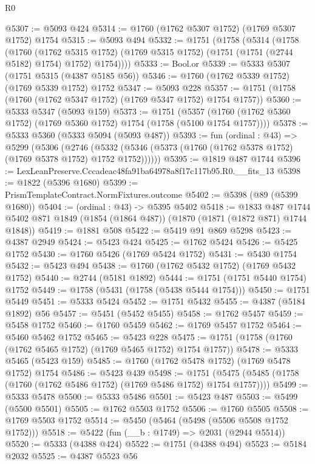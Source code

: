 \begin{lexlean}{R0}
\begin{coremodule}
@5307 := @5093 @424
@5314 := @1760 (@1762 @5307 @1752) (@1769 @5307 @1752) @1754
@5315 := @5093 @494
@5332 := @1751
    (@1758
      (@5314
        (@1758
          (@1760
            (@1762 @5315 @1752)
            (@1769 @5315 @1752)
            (@1751 (@1751 (@2744 @5182) @1754) @1752)
            @1754))))
@5333 := Bool.or
@5339 := @5333 @5307 (@1751 @5315 (@4387 @5185 @56))
@5346 := @1760 (@1762 @5339 @1752) (@1769 @5339 @1752) @1752
@5347 := @5093 @228
@5357 := @1751 (@1758 (@1760 (@1762 @5347 @1752) (@1769 @5347 @1752) @1754 @1757))
@5360 := @5333 @5347 (@5093 @159)
@5373 := @1751
    (@5357 (@1760 (@1762 @5360 @1752) (@1769 @5360 @1752) @1754 (@1758 (@5100 @1754 @1757))))
@5378 := @5333 @5360 (@5333 @5094 (@5093 @487))
@5393 := fun (ordinal : @43) =>
  @5299
    (@5306
      (@2746 (@5332 (@5346 (@5373 (@1760 (@1762 @5378 @1752) (@1769 @5378 @1752) @1752 @1752))))))
@5395 := @1819 @487 @1744
@5396 := LexLeanPreserve.Cccadeac48fa91ba64978a8f17c117b95.R0.__fits_13
@5398 := @1822 (@5396 @1680)
@5399 := PrismTemplateContract.NormFixtures.outcome
@5402 := @5398 (@89 (@5399 @1680))
@5404 := (ordinal : @43) -> @5395 @5402
@5418 := @1833
    @487
    @1744
    @5402
    @871
    @1849
    (@1854 (@1864 @487))
    (@1870 (@1871 (@1872 @871) @1744 @1848))
@5419 := @1881 @508
@5422 := @5419 @91 @869 @5298
@5423 := @4387 @2949
@5424 := @5423 @424
@5425 := @1762 @5424
@5426 := @5425 @1752
@5430 := @1760 @5426 (@1769 @5424 @1752)
@5431 := @5430 @1754
@5432 := @5423 @494
@5438 := @1760 (@1762 @5432 @1752) (@1769 @5432 @1752)
@5440 := @2744 (@5181 @1892)
@5444 := @1751 (@1751 @5440 @1754) @1752
@5449 := @1758 (@5431 (@1758 (@5438 @5444 @1754)))
@5450 := @1751 @5449
@5451 := @5333 @5424
@5452 := @1751 @5432
@5455 := @4387 (@5184 @1892) @56
@5457 := @5451 (@5452 @5455)
@5458 := @1762 @5457
@5459 := @5458 @1752
@5460 := @1760 @5459
@5462 := @1769 @5457 @1752
@5464 := @5460 @5462 @1752
@5465 := @5423 @228
@5475 := @1751 (@1758 (@1760 (@1762 @5465 @1752) (@1769 @5465 @1752) @1754 @1757))
@5478 := @5333 @5465 (@5423 @159)
@5485 := @1760 (@1762 @5478 @1752) (@1769 @5478 @1752) @1754
@5486 := @5423 @439
@5498 := @1751 (@5475 (@5485 (@1758 (@1760 (@1762 @5486 @1752) (@1769 @5486 @1752) @1754 @1757))))
@5499 := @5333 @5478
@5500 := @5333 @5486
@5501 := @5423 @487
@5503 := @5499 (@5500 @5501)
@5505 := @1762 @5503 @1752
@5506 := @1760 @5505
@5508 := @1769 @5503 @1752
@5514 := @5450 (@5464 (@5498 (@5506 @5508 @1752 @1752)))
@5518 := @5422 (fun (__b : @1749) => @2031 (@2944 @5514))
@5520 := @5333 (@4388 @424)
@5522 := @1751 (@4388 @494)
@5523 := @5184 @2032
@5525 := @4387 @5523 @56

\end{coremodule}
\end{lexlean}
